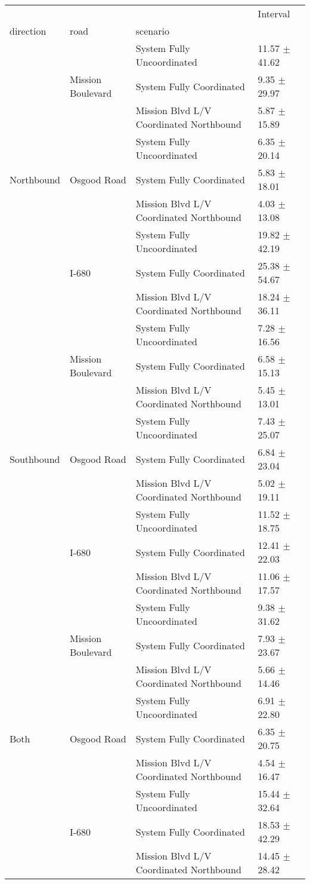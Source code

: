 \begin{tabular}{llll}
\toprule
 &  &  & Interval \\
direction & road & scenario &  \\
\midrule
\multirow[t]{9}{*}{Northbound} & \multirow[t]{3}{*}{Mission Boulevard} & System Fully Uncoordinated & 11.57 $\pm$ 41.62 \\
 &  & System Fully Coordinated & 9.35 $\pm$ 29.97 \\
 &  & Mission Blvd L/V Coordinated Northbound & 5.87 $\pm$ 15.89 \\
 & \multirow[t]{3}{*}{Osgood Road} & System Fully Uncoordinated & 6.35 $\pm$ 20.14 \\
 &  & System Fully Coordinated & 5.83 $\pm$ 18.01 \\
 &  & Mission Blvd L/V Coordinated Northbound & 4.03 $\pm$ 13.08 \\
 & \multirow[t]{3}{*}{I-680} & System Fully Uncoordinated & 19.82 $\pm$ 42.19 \\
 &  & System Fully Coordinated & 25.38 $\pm$ 54.67 \\
 &  & Mission Blvd L/V Coordinated Northbound & 18.24 $\pm$ 36.11 \\
\multirow[t]{9}{*}{Southbound} & \multirow[t]{3}{*}{Mission Boulevard} & System Fully Uncoordinated & 7.28 $\pm$ 16.56 \\
 &  & System Fully Coordinated & 6.58 $\pm$ 15.13 \\
 &  & Mission Blvd L/V Coordinated Northbound & 5.45 $\pm$ 13.01 \\
 & \multirow[t]{3}{*}{Osgood Road} & System Fully Uncoordinated & 7.43 $\pm$ 25.07 \\
 &  & System Fully Coordinated & 6.84 $\pm$ 23.04 \\
 &  & Mission Blvd L/V Coordinated Northbound & 5.02 $\pm$ 19.11 \\
 & \multirow[t]{3}{*}{I-680} & System Fully Uncoordinated & 11.52 $\pm$ 18.75 \\
 &  & System Fully Coordinated & 12.41 $\pm$ 22.03 \\
 &  & Mission Blvd L/V Coordinated Northbound & 11.06 $\pm$ 17.57 \\
\multirow[t]{9}{*}{Both} & \multirow[t]{3}{*}{Mission Boulevard} & System Fully Uncoordinated & 9.38 $\pm$ 31.62 \\
 &  & System Fully Coordinated & 7.93 $\pm$ 23.67 \\
 &  & Mission Blvd L/V Coordinated Northbound & 5.66 $\pm$ 14.46 \\
 & \multirow[t]{3}{*}{Osgood Road} & System Fully Uncoordinated & 6.91 $\pm$ 22.80 \\
 &  & System Fully Coordinated & 6.35 $\pm$ 20.75 \\
 &  & Mission Blvd L/V Coordinated Northbound & 4.54 $\pm$ 16.47 \\
 & \multirow[t]{3}{*}{I-680} & System Fully Uncoordinated & 15.44 $\pm$ 32.64 \\
 &  & System Fully Coordinated & 18.53 $\pm$ 42.29 \\
 &  & Mission Blvd L/V Coordinated Northbound & 14.45 $\pm$ 28.42 \\
\bottomrule
\end{tabular}
